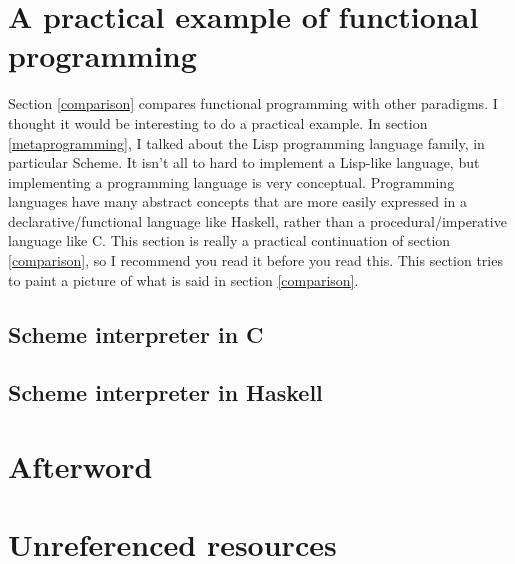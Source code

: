 \documentclass[11pt]{article}
\begin{document}
\section{A practical example of functional programming}

Section \ref{comparison} compares functional programming with other paradigms.
I thought it would be interesting to do a practical example. In section
\ref{metaprogramming}, I talked about the Lisp programming language family, in
particular Scheme. It isn't all to hard to implement a Lisp-like language, but
implementing a programming language is very conceptual. Programming languages
have many abstract concepts that are more easily expressed in a
declarative/functional language like Haskell, rather than a
procedural/imperative language like C. This section is really a practical
continuation of section \ref{comparison}, so I recommend you read it before you
read this. This section tries to paint a picture of what is said in section
\ref{comparison}.

\subsection{Scheme interpreter in C}

\subsection{Scheme interpreter in Haskell}

\newpage
\section*{Afterword}

\newpage
\section*{Unreferenced resources}


\newpage
\printbibliography[heading=bibintoc, title={References}]
\end{document}
